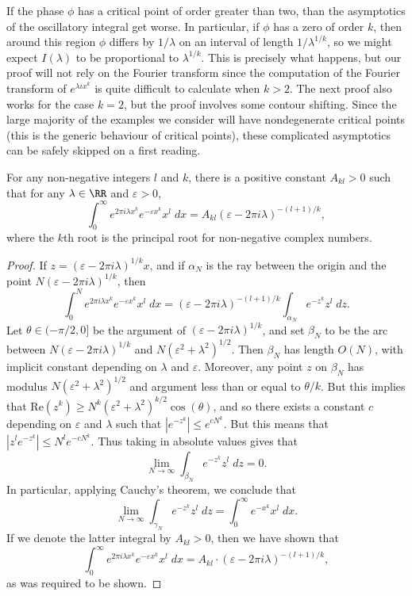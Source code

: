 If the phase $\phi$ has a critical point of order greater than two, than the asymptotics of the oscillatory integral get worse. In particular, if $\phi$ has a zero of order $k$, then around this region $\phi$ differs by $1/\lambda$ on an interval of length $1/\lambda^{1/k}$, so we might expect $I(\lambda)$ to be proportional to $\lambda^{1/k}$. This is precisely what happens, but our proof will not rely on the Fourier transform since the computation of the Fourier transform of $e^{\lambda ix^k}$ is quite difficult to calculate when $k > 2$. The next proof also works for the case $k = 2$, but the proof involves some contour shifting. Since the large majority of the examples we consider will have nondegenerate critical points (this is the generic behaviour of critical points), these complicated asymptotics can be safely skipped on a first reading.

\begin{lemma}
  For any non-negative integers $l$ and $k$, there is a positive constant $A_{kl} > 0$ such that for any $\lambda \in \RR$ and $\varepsilon > 0$,
  \[ \int_0^\infty e^{2 \pi i \lambda x^k} e^{-\varepsilon x^k} x^l\; dx = A_{kl} (\varepsilon - 2 \pi i \lambda)^{-(l+1)/k}, \]
  where the $k$th root is the principal root for non-negative complex numbers.
\end{lemma}
\begin{proof}
  If $z = (\varepsilon - 2 \pi i \lambda)^{1/k} x$, and if $\alpha_N$ is the ray between the origin and the point $N (\varepsilon - 2 \pi i \lambda)^{1/k}$, then
  \[ \int_0^N e^{2 \pi i \lambda x^k} e^{- \varepsilon x^k} x^l\; dx = (\varepsilon - 2 \pi i \lambda)^{-(l+1)/k} \int_{\alpha_N} e^{-z^k} z^l\; dz. \]
  Let $\theta \in (-\pi/2,0]$ be the argument of $(\varepsilon - 2 \pi i \lambda)^{1/k}$, and set $\beta_N$ to be the arc between $N ( \varepsilon - 2 \pi i \lambda)^{1/k}$ and $N (\varepsilon^2 + \lambda^2)^{1/2}$. Then $\beta_N$ has length $O(N)$, with implicit constant depending on $\lambda$ and $\varepsilon$. Moreover, any point $z$ on $\beta_N$ has modulus $N (\varepsilon^2 + \lambda^2)^{1/2}$ and argument less than or equal to $\theta / k$. But this implies that $\text{Re}(z^k) \geq N^k (\varepsilon^2 + \lambda^2)^{k/2} \cos(\theta)$, and so there exists a constant $c$ depending on $\varepsilon$ and $\lambda$ such that $|e^{-z^k}| \leq e^{c N^k}$. But this means that $|z^l e^{-z^k}| \leq N^l e^{-cN^k}$. Thus taking in absolute values gives that
  \[ \lim_{N \to \infty} \int_{\beta_N} e^{-z^k} z^l\; dz = 0. \]
  In particular, applying Cauchy's theorem, we conclude that
  \[ \lim_{N \to \infty} \int_{\gamma_N} e^{-z^k} z^l\; dz = \int_0^\infty e^{-x^k} x^l\; dx. \]
  If we denote the latter integral by $A_{kl} > 0$, then we have shown that
  \[ \int_0^\infty e^{2 \pi i \lambda x^k} e^{-\varepsilon x^k} x^l\; dx = A_{kl} \cdot (\varepsilon - 2 \pi i \lambda)^{-(l+1)/k}, \]
  as was required to be shown.
\end{proof}

